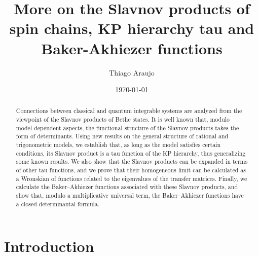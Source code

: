 \documentclass[a4paper,12pt]{amsart}
\begin{document}

\title[Slavnov products, KP and BA functions]{
  More on the Slavnov products of spin chains,
  KP hierarchy tau and Baker-Akhiezer functions 
}

\author{Thiago Araujo}


\address{\noindent 
Institute of Exact Sciences, Department of Physics\\
Fluminense Federal University\\
Rua Des. Ellis Hermydio Figueira, 783, Aterrado\\
27213-145 Volta Redonda, RJ, Brazil
}


\begin{abstract}
Connections between classical and quantum integrable systems are
analyzed from the viewpoint of the Slavnov products of Bethe
states. It is well known that, modulo model-dependent aspects, the
functional structure of the Slavnov products takes the form of
determinants. Using new results on the general structure of rational
and trigonometric models, we establish that, as long as the model
satisfies certain conditions, its Slavnov product is a tau function of
the KP hierarchy, thus generalizing some known results. We also show
that the Slavnov products can be expanded in terms of other tau
functions, and we prove that their homogeneous limit can be calculated
as a Wronskian of functions related to the eigenvalues of the transfer
matrices. Finally, we calculate the Baker–Akhiezer functions
associated with these Slavnov products, and show that, modulo a
multiplicative universal term, the Baker–Akhiezer functions have a
closed determinantal formula.
\end{abstract}

\date{\today}

\maketitle

\setcounter{tocdepth}{2}
\tableofcontents


\section{Introduction}
\end{document}
